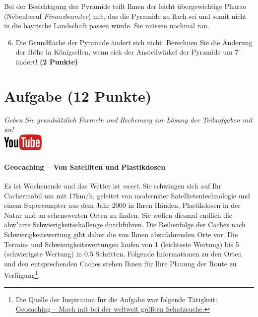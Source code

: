 \documentclass[a4paper, 9pt]{scrartcl}\usepackage[]{graphicx}\usepackage[]{xcolor}
\begin{document}
Bei der Besichtigung der Pyramide teilt Ihnen der leicht {\"u}bergewichtige
Pharao (Nebenberuf \textit{Finanzbeamter}) mit, das die Pyramide zu
flach sei und somit nicht in die bayrische Landschaft passen
w{\"u}rde. Sie m{\"u}ssen nochmal ran.

\begin{enumerate}
  \setcounter{enumi}{5}
\item Die Grundfl{\"a}che der Pyramide {\"a}ndert sich nicht. Berechnen Sie die
  {\"A}nderung der H{\"o}he in K{\"o}nigsellen, wenn sich der Anstellwinkel der
  Pyramide um $7^\circ$ {\"a}ndert!  \textbf{(2 Punkte)}
\end{enumerate}



\clearpage

\section{Aufgabe \hfill (12 Punkte)}

\textit{Geben Sie grunds{\"a}tzlich Formeln und Rechenweg zur L{\"o}sung der
  Teilaufgaben mit an!} \\[1Ex]

\hfill\href{https://youtu.be/3LAq3R0rS14}{\includegraphics[width =
  2cm]{img/youtube}} %
\hspace{2Ex}

\paragraph{Geocaching -- Von Satelliten und Plastikdosen}



Es ist Wochenende und das Wetter ist \textit{sweet}. Sie schwingen sich auf
Ihr Cachermobil um mit 17km/h, geleitet von modernster
Satellietentechnologie und einem Supercompter aus dem Jahr 2000 in Ihren
H{\"a}nden, Plastikdosen in der Natur und an sehenswerten Orten zu finden. Sie
wollen diesmal endlich die abw{"a}rts Schwierigkeitschallenge
durchf{\"u}hren. Die Reihenfolge der Caches nach Schwierigkeitswertung gibt daher
die von Ihnen abzufahrenden Orte vor. Die Terrain- und
Schwierigkeitswertungen laufen von 1 (leichteste Wertung) bis 5
(schwierigste Wertung) in 0.5 Schritten. Folgende Informationen zu den
Orten und den entsprechenden Caches stehen Ihnen f{\"u}r Ihre Planung der Route
zu Verf{\"u}gung\footnote{Die Quelle der Inspiration
  für die Aufgabe war folgende Tätigkeit:
  \href{https://www.geocaching.com/play}{Geocaching -- Mach mit bei der weltweit größten Schatzsuche.}}.
\end{document}
